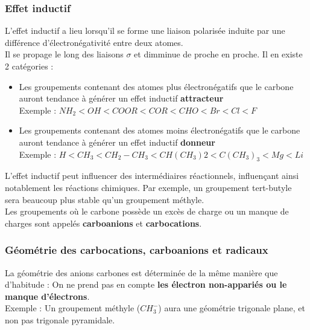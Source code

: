 \documentclass{article}
\newcommand{\insertslide}[2]{
\begin{center}
    \fbox{\texttt{[image: \#1]}}
\end{center}
}
\begin{document}
        \subsubsection{Effet inductif}
            L'effet inductif a lieu lorsqu'il se forme une liaison polarisée induite par une différence d'électronégativité entre deux atomes.\\
            Il se propage le long des liaisons $\sigma$ et dimminue de proche en proche.
            Il en existe 2 catégories :
            \insertslide{Slides/CM3}{20}
            \begin{itemize}
                \item Les groupements contenant des atomes plus électronégatifs que le carbone auront tendance à générer un effet inductif \textbf{attracteur}\\
                Exemple : $NH_2 < OH < COOR < COR < CHO < Br < Cl < F$
                \item Les groupements contenant des atomes moins électronégatifs que le carbone auront tendance à générer un effet inductif \textbf{donneur}\\
                Exemple : $H < CH_3 < CH_2-CH_3 < CH(CH_3) 2 < C(CH_3)_3 < Mg < Li$
            \end{itemize}
            L'effet inductif peut influencer des intermédiaires réactionnels, influençant ainsi notablement les réactions chimiques. Par exemple, un groupement tert-butyle sera beaucoup plus stable qu'un groupement méthyle.\\
            Les groupements où le carbone possède un excès de charge ou un manque de charges sont appelés \textbf{carboanions} et \textbf{carbocations}.
        
        \subsubsection{Géométrie des carbocations, carboanions et radicaux}
            La géométrie des anions carbones est déterminée de la même manière que d'habitude : On ne prend pas en compte \textbf{les électron non-appariés ou le manque d'électrons}.\\
            Exemple : Un groupement méthyle ($CH_3^-$) aura une géométrie trigonale plane, et non pas trigonale pyramidale.
        
\end{document}
